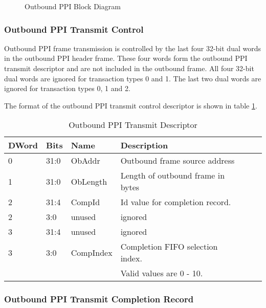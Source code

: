 \documentclass[11pt]{article}
\begin{document}
\begin{figure}[H]
   \centering
   \caption{Outbound PPI Block Diagram}
   \label{fig:ob_ppi_block}
\end{figure}

\subsubsection{Outbound PPI Transmit Control}

Outbound PPI frame transmission is controlled by the last four 32-bit dual words in the outbound PPI header frame. 
These four words form the outbound PPI transmit descriptor and are not included in the outbound frame. All four
32-bit dual words are ignored for transaction types 0 and 1. The last two dual words are ignored for transaction
types 0, 1 and 2.

The format of the outbound PPI transmit control descriptor is shown in table \ref{tab:ob_ppi_cntrl}.

\begin{table}[H]
\small
\centering
   \begin{tabular}{| l | l | l | l | l | l | } 
      \hline \textbf{DWord} & \textbf{Bits} & \textbf{Name} & \textbf{Description} \\
      \hline 0              & 31:0          & ObAddr        & Outbound frame source address     \\
      \hline 1              & 31:0          & ObLength      & Length of outbound frame in bytes \\
      \hline 2              & 31:4          & CompId        & Id value for completion record.  \\
      \hline 2              & 3:0           & unused        & ignored                           \\
      \hline 3              & 31:4          & unused        & ignored                           \\
      \hline 3              & 3:0           & CompIndex     & Completion FIFO selection index.  \\
                            &               &               & Valid values are 0 - 10.          \\
      \hline
   \end{tabular}
   \caption{Outbound PPI Transmit Descriptor}
   \label{tab:ob_ppi_cntrl}
\end{table}

\subsubsection{Outbound PPI Transmit Completion Record}
\end{document}

